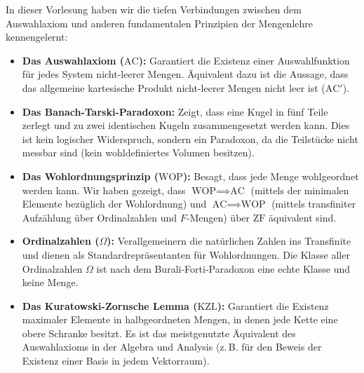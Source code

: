 \begin{nice-box}
In dieser Vorlesung haben wir die tiefen Verbindungen zwischen dem Auswahlaxiom und anderen fundamentalen Prinzipien der Mengenlehre kennengelernt:
\begin{itemize}
    \item \textbf{Das Auswahlaxiom ($\text{AC}$):} Garantiert die Existenz einer Auswahlfunktion für jedes System nicht-leerer Mengen. Äquivalent dazu ist die Aussage, dass das allgemeine kartesische Produkt nicht-leerer Mengen nicht leer ist ($\text{AC}'$).
    \item \textbf{Das Banach-Tarski-Paradoxon:} Zeigt, dass eine Kugel in fünf Teile zerlegt und zu zwei identischen Kugeln zusammengesetzt werden kann. Dies ist kein logischer Widerspruch, sondern ein Paradoxon, da die Teilstücke nicht messbar sind (kein wohldefiniertes Volumen besitzen).
    \item \textbf{Das Wohlordnungsprinzip ($\text{WOP}$):} Besagt, dass jede Menge wohlgeordnet werden kann. Wir haben gezeigt, dass $\text{WOP} \implies \text{AC}$ (mittels der minimalen Elemente bezüglich der Wohlordnung) und $\text{AC} \implies \text{WOP}$ (mittels transfiniter Aufzählung über Ordinalzahlen und $F$-Mengen) über $\text{ZF}$ äquivalent sind.
    \item \textbf{Ordinalzahlen ($\Omega$):} Verallgemeinern die natürlichen Zahlen ins Transfinite und dienen als Standardrepräsentanten für Wohlordnungen. Die Klasse aller Ordinalzahlen $\Omega$ ist nach dem Burali-Forti-Paradoxon eine echte Klasse und keine Menge.
    \item \textbf{Das Kuratowski-Zornsche Lemma ($\text{KZL}$):} Garantiert die Existenz maximaler Elemente in halbgeordneten Mengen, in denen jede Kette eine obere Schranke besitzt. Es ist das meistgenutzte Äquivalent des Auswahlaxioms in der Algebra und Analysis (z.\,B. für den Beweis der Existenz einer Basis in jedem Vektorraum).
\end{itemize}
\end{nice-box}

